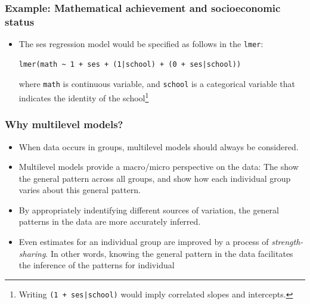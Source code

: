 \documentclass[10pt,xcolor=dvipsnames,serif,professionalfont]{beamer} %
\begin{document}
\begin{frame}[fragile]
\frametitle{Example: Mathematical achievement and socioeconomic status}
\begin{itemize}
\item The ses regression model would be specified as follows in the \texttt{lmer}:
\begin{center}
\begin{verbatim}
lmer(math ~ 1 + ses + (1|school) + (0 + ses|school))
\end{verbatim}
\end{center}
where \texttt{math} is continuous variable, and \texttt{school} is a categorical variable that indicates the identity of the school\footnote{Writing \texttt{(1 + ses|school)} would imply correlated slopes and intercepts.}
\end{itemize}
\end{frame}



\begin{frame}
\frametitle{Why multilevel models?}
\begin{itemize}
\item When data occurs in groups, multilevel models should always be considered.
\item Multilevel models provide a macro/micro perspective on the data: The show the general pattern across all groups, and show how each individual group varies about this general pattern.
\item By appropriately indentifying different sources of variation, the general patterns in the data are more accurately inferred.
\item Even estimates for an individual group are improved by a process of \emph{strength-sharing}. In other words, knowing the general pattern in the data facilitates the inference of the patterns for individual 
\end{itemize}
\end{frame}
\end{document}
